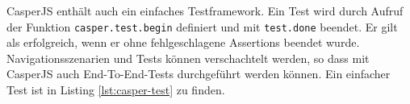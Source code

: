 CasperJS enthält auch ein einfaches Testframework. Ein Test wird durch Aufruf der Funktion \texttt{casper.test.begin} definiert und mit \texttt{test.done} beendet. Er gilt als erfolgreich, wenn er ohne fehlgeschlagene Assertions beendet wurde. Navigationsszenarien und Tests können verschachtelt werden, so dass mit CasperJS auch End-To-End-Tests durchgeführt werden können.\cite{casperjs-index, casperjs-test} Ein einfacher Test ist in Listing \ref{lst:casper-test} zu finden.

\begin{figure}[H]
	
\end{figure}